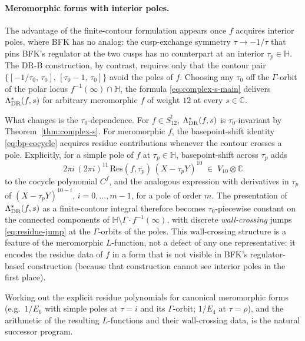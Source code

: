 \documentclass[11pt,letterpaper]{article}
\newcommand{\HH}{\mathbb{H}}
\newcommand{\CC}{\mathbb{C}}
\begin{document}
\paragraph{Meromorphic forms with interior poles.}
The advantage of the finite-contour formulation appears once $f$
acquires interior poles, where BFK has no analog: the cusp-exchange
symmetry $\tau \to -1/\tau$ that pins BFK's regulator at the two cusps
has no counterpart at an interior $\tau_p \in \HH$.  The DR-B
construction, by contrast, requires only that the contour pair
$\{[-1/\tau_0,\,\tau_0],\,[\tau_0 - 1,\,\tau_0]\}$ avoid the poles of
$f$.  Choosing any $\tau_0$ off the $\Gamma$-orbit of the polar locus
$f^{-1}(\infty) \cap \HH$, the formula
\eqref{eq:complex-s-main} delivers $\Lambda^*_{\rm DR}(f, s)$ for
arbitrary meromorphic $f$ of weight $12$ at every $s \in \CC$.

What changes is the $\tau_0$-dependence.  For $f \in S_{12}^!$,
$\Lambda^*_{\rm DR}(f, s)$ is $\tau_0$-invariant by
Theorem~\ref{thm:complex-s}.  For meromorphic $f$, the
basepoint-shift identity \eqref{eq:bp-cocycle} acquires residue
contributions whenever the contour crosses a pole.  Explicitly, for a
simple pole of $f$ at $\tau_p \in \HH$, basepoint-shift across
$\tau_p$ adds
\begin{equation}\label{eq:residue-jump}
  2\pi i\,(2\pi i)^{11}\,\mathrm{Res}(f, \tau_p)\,(X - \tau_p Y)^{10}
  \;\in\; V_{10}\otimes\CC
\end{equation}
to the cocycle polynomial $C^f$, and the analogous expression with
derivatives in $\tau_p$ of $(X - \tau_p Y)^{10-i}$, $i = 0, \ldots,
m-1$, for a pole of order $m$.  The presentation of $\Lambda^*_{\rm
DR}(f, s)$ as a finite-contour integral therefore becomes
$\tau_0$-piecewise constant on the connected components of
$\HH \setminus \Gamma\!\cdot\!f^{-1}(\infty)$, with discrete
\emph{wall-crossing} jumps \eqref{eq:residue-jump} at the
$\Gamma$-orbits of the poles.  This wall-crossing structure is a
feature of the meromorphic $L$-function, not a defect of any one
representative: it encodes the residue data of $f$ in a form that is
not visible in BFK's regulator-based construction (because that
construction cannot see interior poles in the first place).

Working out the explicit residue polynomials for canonical
meromorphic forms (e.g.\ $1/E_6$ with simple poles at $\tau = i$ and
its $\Gamma$-orbit; $1/E_4$ at $\tau = \rho$), and the arithmetic of
the resulting $L$-functions and their wall-crossing data, is the
natural successor program.
\end{document}

